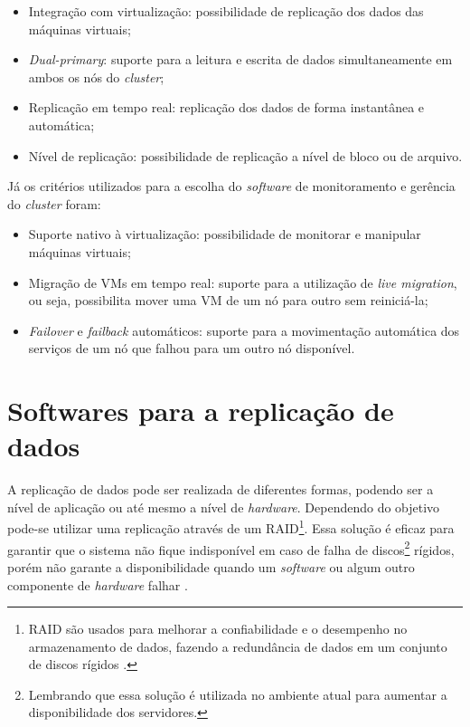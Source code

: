 \begin{itemize}
 \item Integração com virtualização: possibilidade de replicação dos dados das máquinas virtuais;
 \item \textit{Dual-primary}: suporte para a leitura e escrita de dados simultaneamente em ambos os nós do \textit{cluster};
 \item Replicação em tempo real: replicação dos dados de forma instantânea e automática;
 \item Nível de replicação: possibilidade de replicação a nível de bloco ou de arquivo.
\end{itemize}

Já os critérios utilizados para a escolha do \textit{software} de monitoramento e gerência do \textit{cluster} foram:
\begin{itemize}
 \item Suporte nativo à virtualização: possibilidade de monitorar e manipular máquinas virtuais;
 \item Migração de \acp{VM} em tempo real: suporte para a utilização de \textit{live migration}, ou seja, possibilita mover 
 uma \ac{VM} de um nó para outro sem reiniciá-la;
 \item \textit{Failover} e \textit{failback} automáticos: suporte para a movimentação automática dos serviços de um nó que falhou para um outro 
 nó disponível.
\end{itemize}

\section{Softwares para a replicação de dados}
\label{section:toolrepl}

A replicação de dados pode ser realizada de diferentes formas, podendo ser a nível de aplicação ou até mesmo a nível de \textit{hardware}.
Dependendo do objetivo pode-se utilizar uma replicação através de um \ac{RAID}\footnote[1]{RAID são usados para melhorar a confiabilidade e o
desempenho no armazenamento de dados, fazendo a redundância de dados em um conjunto de discos rígidos \cite{zaminhani2008}.}. 
Essa solução é eficaz para garantir que o sistema não fique indisponível em caso de falha de discos\footnote[2]{Lembrando que essa solução é 
utilizada no ambiente atual para aumentar a disponibilidade dos servidores.} rígidos, porém não garante a disponibilidade quando um 
\textit{software} ou algum outro componente de \textit{hardware} falhar \cite{zaminhani2008}.

